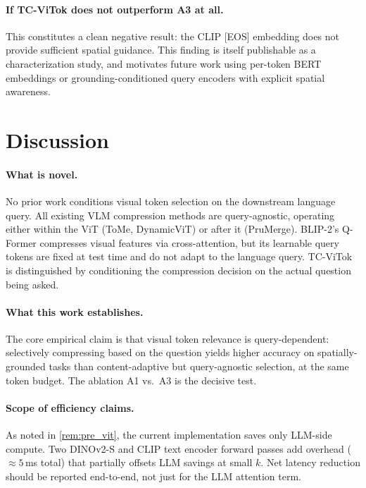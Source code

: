 \documentclass[11pt,a4paper]{article}
\begin{document}
\paragraph{If TC-ViTok does not outperform A3 at all.}
This constitutes a clean negative result: the CLIP [EOS] embedding does not
provide sufficient spatial guidance. This finding is itself publishable as a
characterization study, and motivates future work using per-token BERT embeddings
or grounding-conditioned query encoders with explicit spatial awareness.

\section{Discussion}
\label{sec:discussion}

\paragraph{What is novel.}
No prior work conditions visual token selection on the downstream language query.
All existing VLM compression methods are query-agnostic, operating either within
the ViT (ToMe, DynamicViT) or after it (PruMerge). BLIP-2's Q-Former compresses
visual features via cross-attention, but its learnable query tokens are fixed at
test time and do not adapt to the language query. TC-ViTok is distinguished by
conditioning the compression decision on the actual question being asked.

\paragraph{What this work establishes.}
The core empirical claim is that visual token relevance is query-dependent:
selectively compressing based on the question yields higher accuracy on
spatially-grounded tasks than content-adaptive but query-agnostic selection,
at the same token budget. The ablation A1 vs.\ A3 is the decisive test.

\paragraph{Scope of efficiency claims.}
As noted in \cref{rem:pre_vit}, the current implementation saves only LLM-side
compute. Two DINOv2-S and CLIP text encoder forward passes add overhead
(${\approx}5$\,ms total) that partially offsets LLM savings at small $k$.
Net latency reduction should be reported end-to-end, not just for the LLM
attention term.
\end{document}
